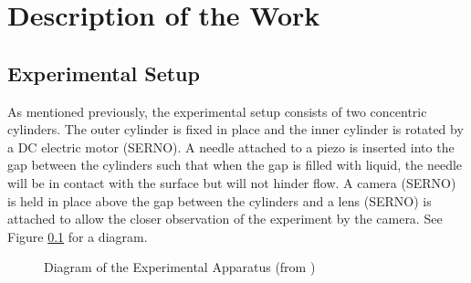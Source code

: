 \documentclass[a4]{report}
\def\achapter{preamble}
\begin{document}
	



	\chapter*{Description of the Work}
	\def\achapter{Description of the Work}



	\section{Experimental Setup}
	As mentioned previously, the experimental setup consists of two concentric cylinders. The outer cylinder is fixed in place and the inner cylinder is rotated by a DC electric motor (SERNO). A needle attached to a piezo is inserted into the gap between the cylinders such that when the gap is filled with liquid, the needle will be in contact with the surface but will not hinder flow. A camera (SERNO) is held in place above the gap between the cylinders and a lens (SERNO) is attached to allow the closer observation of the experiment by the camera. See Figure \ref{expdia} for a diagram.\newline
	\begin{figure}[!h]
	\centering
	\caption{Diagram of the Experimental Apparatus (from )}
	\label{expdia}
	\end{figure} \newline  \noindent
\end{document}

